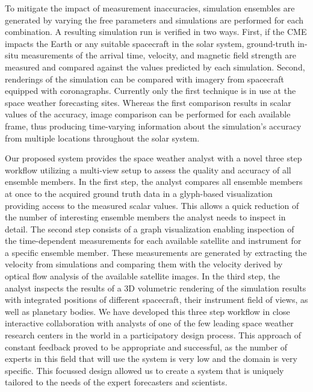 \documentclass[journal]{vgtc}                %
\begin{document}
To mitigate the impact of measurement inaccuracies, simulation ensembles are generated by varying the free parameters and simulations are performed for each combination. A resulting simulation run is verified in two ways. First, if the CME impacts the Earth or any suitable spacecraft in the solar system, ground-truth in-situ measurements of the arrival time, velocity, and magnetic field strength are measured and compared against the values predicted by each simulation. Second, renderings of the simulation can be compared with imagery from spacecraft equipped with coronagraphs. Currently only the first technique is in use at the space weather forecasting sites. Whereas the first comparison results in scalar values of the accuracy, image comparison can be performed for each available frame, thus producing time-varying information about the simulation's accuracy from multiple locations throughout the solar system.


Our proposed system provides the space weather analyst with a novel three step workflow utilizing a multi-view setup to assess the quality and accuracy of all ensemble members. In the first step, the analyst compares all ensemble members at once to the acquired ground truth data in a glyph-based visualization providing access to the measured scalar values. This allows a quick reduction of the number of interesting ensemble members the analyst needs to inspect in detail. The second step consists of a graph visualization enabling inspection of the time-dependent measurements for each available satellite and instrument for a specific ensemble member. These measurements are generated by extracting the velocity from simulations and comparing them with the velocity derived by optical flow analysis of the available satellite images. In the third step, the analyst inspects the results of a 3D volumetric rendering of the simulation results with integrated positions of different spacecraft, their instrument field of views, as well as planetary bodies. We have developed this three step workflow in close interactive collaboration with analysts of one of the few leading space weather research centers in the world in a participatory design process. This approach of constant feedback proved to be appropriate and successful, as the number of experts in this field that will use the system is very low and the domain is very specific. This focussed design allowed us to create a system that is uniquely tailored to the needs of the expert forecasters and scientists. 
\end{document}
